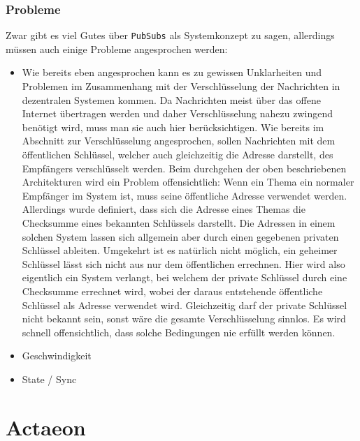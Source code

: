 \documentclass[11pt]{article}
\begin{document}
\subsubsection{Probleme}
\label{sec:orgeae10a9}
Zwar gibt es viel Gutes über \texttt{PubSubs} als Systemkonzept zu sagen,
allerdings müssen auch einige Probleme angesprochen werden:
\begin{itemize}
\item Wie bereits eben angesprochen kann es zu gewissen Unklarheiten und
Problemen im Zusammenhang mit der Verschlüsselung der Nachrichten in
dezentralen Systemen kommen. Da Nachrichten meist über das offene
Internet übertragen werden und daher Verschlüsselung nahezu zwingend
benötigt wird, muss man sie auch hier berücksichtigen. Wie bereits
im Abschnitt zur Verschlüsselung angesprochen, sollen Nachrichten
mit dem öffentlichen Schlüssel, welcher auch gleichzeitig die
Adresse darstellt, des Empfängers verschlüsselt werden. Beim
durchgehen der oben beschriebenen Architekturen wird ein Problem
offensichtlich: Wenn ein Thema ein normaler Empfänger im System ist,
muss seine öffentliche Adresse verwendet werden. Allerdings wurde
definiert, dass sich die Adresse eines Themas die Checksumme eines
bekannten Schlüssels darstellt. Die Adressen in einem solchen System
lassen sich allgemein aber durch einen gegebenen privaten Schlüssel
ableiten. Umgekehrt ist es natürlich nicht möglich, ein geheimer
Schlüssel lässt sich nicht aus nur dem öffentlichen errechnen. Hier
wird also eigentlich ein System verlangt, bei welchem der private
Schlüssel durch eine Checksumme errechnet wird, wobei der daraus
entstehende öffentliche Schlüssel als Adresse verwendet wird.
Gleichzeitig darf der private Schlüssel nicht bekannt sein, sonst
wäre die gesamte Verschlüsselung sinnlos. Es wird schnell
offensichtlich, dass solche Bedingungen nie erfüllt werden können.
\item Geschwindigkeit
\item State / Sync
\end{itemize}
\section{Actaeon}
\label{sec:orgb703317}
\end{document}
